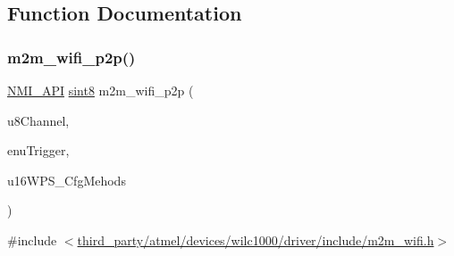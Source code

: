 \subsection{Function Documentation}
\mbox{\label{group__WifiP2PFn_ga9d2daba93e1e2e33bde42edd359eb2f2}} 
\subsubsection{\texorpdfstring{m2m\+\_\+wifi\+\_\+p2p()}{m2m\_wifi\_p2p()}}
{\footnotesize\ttfamily \hyperlink{group__BSPDefine_gaecc0323d771e41ef81a76b5f12783e22}{N\+M\+I\+\_\+\+A\+PI} \hyperlink{group__DataT_gae35f10ffd0ac8dd2bc3e794da9bdfbc7}{sint8} m2m\+\_\+wifi\+\_\+p2p (\begin{DoxyParamCaption}\item[{\hyperlink{group__DataT_ga4df709a77647e870bbf1d955b8edc9a6}{uint8}}]{u8\+Channel,  }\item[{\hyperlink{group__WlanEnums_ga0b97cca65d26d6163cabcb708e5759df}{tenu\+P2\+P\+Trigger}}]{enu\+Trigger,  }\item[{\hyperlink{group__DataT_ga1daa745171fc6e31d942c161422a76f9}{uint16}}]{u16\+W\+P\+S\+\_\+\+Cfg\+Mehods }\end{DoxyParamCaption})}



{\ttfamily \#include $<$\hyperlink{m2m__wifi_8h}{third\+\_\+party/atmel/devices/wilc1000/driver/include/m2m\+\_\+wifi.\+h}$>$}


